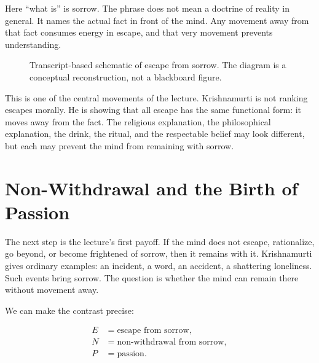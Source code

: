 Here ``what is'' is sorrow. The phrase does not mean a doctrine of reality in general. It names the actual fact in front of the mind. Any movement away from that fact consumes energy in escape, and that very movement prevents understanding.

\begin{figure}
\centering
{}
\caption{Transcript-based schematic of escape from sorrow. The diagram is a conceptual reconstruction, not a blackboard figure.}
\end{figure}

This is one of the central movements of the lecture. Krishnamurti is not ranking escapes morally. He is showing that all escape has the same functional form: it moves away from the fact. The religious explanation, the philosophical explanation, the drink, the ritual, and the respectable belief may look different, but each may prevent the mind from remaining with sorrow.

\section{Non-Withdrawal and the Birth of Passion}

The next step is the lecture's first payoff. If the mind does not escape, rationalize, go beyond, or become frightened of sorrow, then it remains with it. Krishnamurti gives ordinary examples: an incident, a word, an accident, a shattering loneliness. Such events bring sorrow. The question is whether the mind can remain there without movement away.

We can make the contrast precise:

\begin{align}
E &= \text{escape from sorrow},\\
N &= \text{non-withdrawal from sorrow},\\
P &= \text{passion}.
\end{align}

